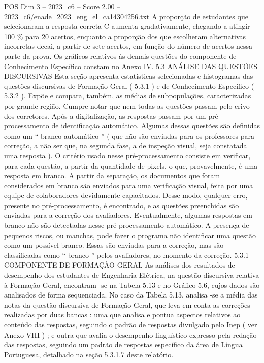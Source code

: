 \begin{textsample}{POS Dim 3 – 2023\_c6 – Score 2.00 – 2023\_c6/enade\_2023\_eng\_el\_ca14304256.txt}
A proporção de estudantes que selecionaram a resposta correta C aumenta gradativamente, chegando a atingir 100 \% para 20 acertos, enquanto a proporção dos que escolheram alternativas incorretas decai, a partir de sete acertos, em função do número de acertos nessa parte da prova.
Os gráficos relativos às demais questões do componente de Conhecimento Específico constam no Anexo IV. 5.3 ANÁLISE DAS QUESTÕES DISCURSIVAS Esta seção apresenta estatísticas selecionadas e histogramas das questões discursivas de Formação Geral ( 5.3.1 ) e de Conhecimento Específico ( 5.3.2 ).
Expõe e compara, também, as médias de subpopulações, caracterizadas por grande região.
Cumpre notar que nem todas as questões passam pelo crivo dos corretores.
Após a digitalização, as respostas passam por um pré-processamento de identificação automático.
Algumas dessas questões são definidas como um “ branco automático ” ( que não são enviadas para os professores para correção, a não ser que, na segunda fase, a de inspeção visual, seja constatada uma resposta ).
O critério usado nesse pré-processamento consiste em verificar, para cada questão, a partir da quantidade de pixels, o que, provavelmente, é uma resposta em branco.
A partir da separação, os documentos que foram considerados em branco são enviados para uma verificação visual, feita por uma equipe de colaboradores devidamente capacitados.
Desse modo, qualquer erro, presente no pré-processamento, é encontrado, e as questões preenchidas são enviadas para a correção dos avaliadores.
Eventualmente, algumas respostas em branco não são detectadas nesse pré-processamento automático.
A presença de pequenos riscos, ou manchas, pode fazer o programa não identificar uma questão como um possível branco.
Essas são enviadas para a correção, mas são classificadas como “ branco ” pelos avaliadores, no momento da correção. 5.3.1 COMPONENTE DE FORMAÇÃO GERAL As análises dos resultados de desempenho dos estudantes de Engenharia Elétrica, na questão discursiva relativa à Formação Geral, encontram -se na Tabela 5.13 e no Gráfico 5.6, cujos dados são analisados de forma sequenciada.
No caso da Tabela 5.13, analisa -se a média das notas da questão discursiva de Formação Geral, que leva em conta as correções realizadas por duas bancas : uma que analisa e pontua aspectos relativos ao conteúdo das respostas, seguindo o padrão de respostas divulgado pelo Inep ( ver Anexo VIII ) ; e outra que avalia o desempenho linguístico expresso pela redação das respostas, seguindo um padrão de respostas específico da área de Língua Portuguesa, detalhado na seção 5.3.1.7 deste relatório.

\end{textsample}
